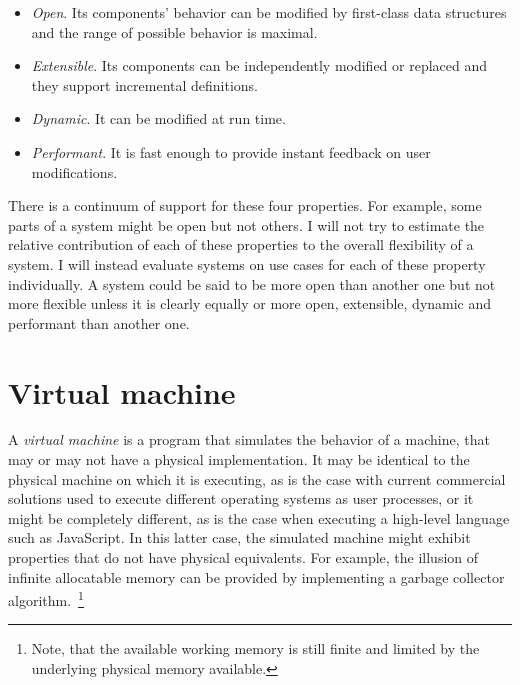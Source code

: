 \begin{itemize}
    \item \textit{Open}. Its components' behavior can be modified by
        first-class data structures and the range of possible behavior is
        maximal. 

    \item \textit{Extensible}. Its components can be independently modified or
        replaced and they support incremental definitions. 

    \item \textit{Dynamic}. It can be modified at run time.

    \item \textit{Performant}. It is fast enough to provide instant feedback on
        user modifications.
\end{itemize}

There is a continuum of support for these four properties. For example, some
parts of a system might be open but not others.  I will not try to estimate the
relative contribution of each of these properties to the overall flexibility of
a system. I will instead evaluate systems on use cases for each of these
property individually. A system could be said to be more open than another one
but not more flexible unless it is clearly equally or more open, extensible,
dynamic and performant than another one.

\section{Virtual machine}

A \textit{virtual machine} is a program that simulates the behavior of a
machine, that may or may not have a physical implementation. It may be
identical to the physical machine on which it is executing, as is the case with
current commercial solutions used to execute different operating systems as user
processes, or it might be completely different, as is the case when executing a
high-level language such as JavaScript. In this latter case, the simulated
machine might exhibit properties that do not have physical equivalents.
For example, the illusion of infinite allocatable memory can be provided by
implementing a garbage collector algorithm.~\footnote{Note, that the available
working memory is still finite and limited by the underlying physical memory
available.} 


